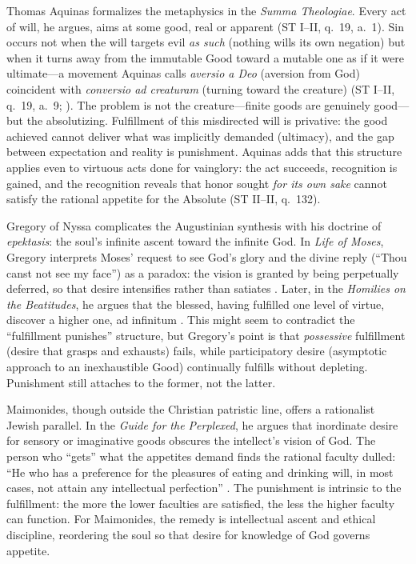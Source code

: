 Thomas Aquinas formalizes the metaphysics in the \emph{Summa Theologiae}. Every act of will,
he argues, aims at some good, real or apparent (ST I--II, q.~19, a.~1). Sin occurs not when
the will targets evil \emph{as such} (nothing wills its own negation) but when it turns away
from the immutable Good toward a mutable one as if it were ultimate---a movement Aquinas calls
\emph{aversio a Deo} (aversion from God) coincident with \emph{conversio ad creaturam}
(turning toward the creature) (ST I--II, q.~19, a.~9; ). The
problem is not the creature---finite goods are genuinely good---but the absolutizing.
Fulfillment of this misdirected will is privative: the good achieved cannot deliver what was
implicitly demanded (ultimacy), and the gap between expectation and reality is punishment.
Aquinas adds that this structure applies even to virtuous acts done for vainglory: the act
succeeds, recognition is gained, and the recognition reveals that honor sought \emph{for its
	own sake} cannot satisfy the rational appetite for the Absolute (ST II--II, q.~132).

Gregory of Nyssa complicates the Augustinian synthesis with his doctrine of \emph{epektasis}:
the soul's infinite ascent toward the infinite God. In \emph{Life of Moses}, Gregory interprets
Moses' request to see God's glory and the divine reply (``Thou canst not see my face'') as a
paradox: the vision is granted by being perpetually deferred, so that desire intensifies
rather than satiates . Later, in the \emph{Homilies on the
	Beatitudes}, he argues that the blessed, having fulfilled one level of virtue, discover a
higher one, ad infinitum . This might seem to
contradict the ``fulfillment punishes'' structure, but Gregory's point is that
\emph{possessive} fulfillment (desire that grasps and exhausts) fails, while participatory
desire (asymptotic approach to an inexhaustible Good) continually fulfills without depleting.
Punishment still attaches to the former, not the latter.

Maimonides, though outside the Christian patristic line, offers a rationalist Jewish parallel.
In the \emph{Guide for the Perplexed}, he argues that inordinate desire for sensory or
imaginative goods obscures the intellect's vision of God. The person who ``gets'' what the
appetites demand finds the rational faculty dulled: ``He who has a preference for the
pleasures of eating and drinking will, in most cases, not attain any intellectual perfection''
. The punishment is intrinsic to the fulfillment: the
more the lower faculties are satisfied, the less the higher faculty can function. For
Maimonides, the remedy is intellectual ascent and ethical discipline, reordering the soul so
that desire for knowledge of God governs appetite.

